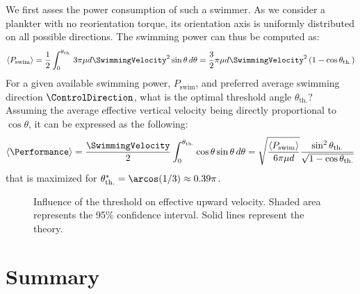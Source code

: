 We first asses the power consumption of such a swimmer.
As we consider a plankter with no reorientation torque, its orientation axis is uniformly distributed on all possible directions.
The swimming power can thus be computed as:
\begin{equation}
	\left\langle P_{\mathrm{swim}} \right\rangle = \frac{1}{2} \int_0^{\theta_{\mathrm{th.}}} 3 \pi \mu d \SwimmingVelocity^2 \sin \theta \, d\theta = \frac{3}{2} \pi \mu d \SwimmingVelocity^2 \left( 1 - \cos \theta_{\mathrm{th.}} \right)
\end{equation}
For a given available swimming power, $P_{\mathrm{swim}}$, and preferred average swimming direction $\ControlDirection$, what is the optimal threshold angle $\theta_{\mathrm{th.}}$?
Assuming the average effective vertical velocity being directly proportional to $\cos \theta$, it can be expressed as the following:  
\begin{equation}
	\left\langle \Performance \right\rangle = \frac{\SwimmingVelocity}{2} \int_0^{\theta_{\mathrm{th.}}} \cos \theta \sin \theta \, d\theta = \sqrt{\frac{\left\langle P_{\mathrm{swim}} \right\rangle}{6 \pi \mu d}} \frac{\sin^2 \theta_{\mathrm{th.}}}{\sqrt{1 - \cos \theta_{\mathrm{th.}}}}
\end{equation}
that is maximized for $\theta_{\mathrm{th.}}^* = \arcos (1/3) \approx 0.39 \pi$.
\begin{figure}%
	\centering
	
	\caption{
		Influence of the threshold on effective upward velocity.
		Shaded area represents the 95\% confidence interval.
		Solid lines represent the theory.
	}
	\label{fig:energy_efficiency}
\end{figure}

\section{Summary}
